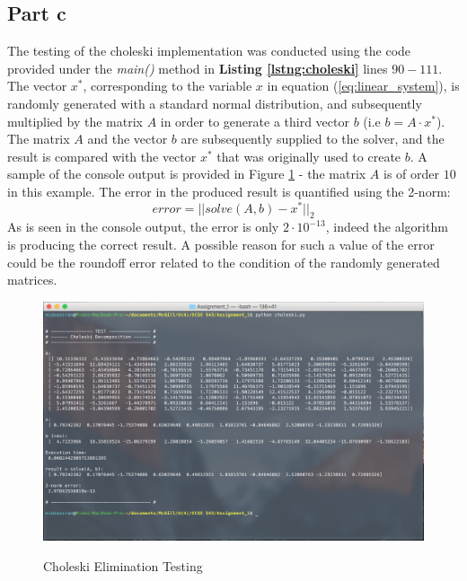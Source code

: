 \documentclass[11pt]{amsart}
\begin{document}
\subsection*{Part c}
The testing of the choleski implementation was conducted using the code provided under the \textit{main()} method in \textbf{Listing \ref{lstng:choleski}} lines $90 - 111$. The vector $x^*$, corresponding to the variable $x$ in equation (\ref{eq:linear_system}), is randomly generated with a standard normal distribution, and subsequently multiplied by the matrix $A$ in order to generate a third vector $b$  (i.e $b = A \cdot x^*$). The matrix $A$ and the vector $b$ are subsequently supplied to the solver, and the result is compared with the vector $x^*$ that was originally used to create $b$. A sample of the console output is provided in Figure \ref{fig:choleski_testing} - the matrix $A$ is of order $10$ in this example. The error in the produced result is quantified using the 2-norm: $$error = ||solve(A, b) - x^*||_2$$ As is seen in the console output, the error is only $2 \cdot 10^{-13}$, indeed the algorithm is producing the correct result. A possible reason for such a value of the error could be the roundoff error related to the condition of the randomly generated matrices.
\begin{center}
	\begin{figure}[h]
		\caption{Choleski Elimination Testing}
		\vspace*{1em}
		\includegraphics[width=\textwidth]{assets/choleski_testing.png}\label{fig:choleski_testing}
	\end{figure}
\end{center}
\end{document}

